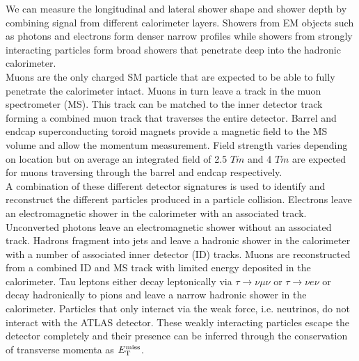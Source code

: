 
\indent We can measure the longitudinal and lateral shower shape and shower depth by combining signal from different calorimeter layers. Showers from EM objects such as photons and electrons form denser narrow profiles while showers from strongly interacting particles form broad showers that penetrate deep into the hadronic calorimeter. \\

\indent Muons are the only charged SM particle that are expected to be able to fully penetrate the calorimeter intact.  Muons in turn leave a track in the muon spectrometer (MS).  This track can be matched to the inner detector track forming a combined muon track that traverses the entire detector.  Barrel and endcap superconducting toroid magnets provide a magnetic field to the MS volume and allow the momentum measurement.  Field strength varies depending on location but on average an integrated field of 2.5 $T \dot m$ and 4 $T \dot m$ are expected for muons traversing through the barrel and endcap respectively.\\

\indent A combination of these different detector signatures is used to identify and reconstruct the different particles produced in a particle collision.  Electrons leave an electromagnetic shower in the calorimeter with an associated track.  Unconverted photons leave an electromagnetic shower without an associated track.  Hadrons fragment into jets and leave a hadronic shower in the calorimeter with a number of associated inner detector (ID) tracks.  Muons are reconstructed from a combined ID and MS track with limited energy deposited in the calorimeter.  Tau leptons either decay leptonically via $\tau \rightarrow \nu \mu \nu$ or $\tau \rightarrow \nu e \nu$ or decay hadronically to pions and leave a narrow hadronic shower in the calorimeter.  Particles that only interact via the weak force, i.e. neutrinos, do not interact with the ATLAS detector.  These weakly interacting particles escape the detector completely and their presence can be inferred through the conservation of transverse momenta as $E_{\mathrm{T}}^{\mathrm{miss}}$.\\

